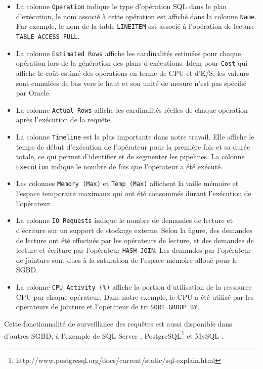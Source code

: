 \begin{itemize}
 \item La colonne \texttt{Operation} indique le type d'opération SQL dans le plan d'exécution, le nom associé à cette opération est affiché dans la colonne \texttt{Name}. Par exemple, le nom de la table \texttt{LINEITEM} est associé à l'opération de lecture \texttt{TABLE ACCESS FULL}.
 \item La colonne \texttt{Estimated Rows} affiche les cardinalités estimées pour chaque opération lors de la génération des plans d'exécutions. Idem pour \texttt{Cost} qui affiche le coût estimé des opérations en terme de CPU et d'E/S, les valeurs sont cumulées de bas vers le haut et son unité de mesure n'est pas spécifié par Oracle.
 \item La colonne \texttt{Actual Rows} affiche les cardinalités réelles de chaque opération après l'exécution de la requête.
 \item La colonne \texttt{Timeline} est la plus importante dans notre travail. Elle affiche le temps de début d'exécution de l'opérateur pour la première fois et sa durée totale, ce qui permet d'identifier et de segmenter les pipelines. La colonne \texttt{Execution} indique le nombre de fois que l'opérateur a été exécuté.
 \item Les colonnes \texttt{Memory (Max)} et \texttt{Temp (Max)} affichent la taille mémoire et l'espace temporaire maximaux qui ont été consommés durant l'exécution de l'opérateur.
 \item La colonne \texttt{IO Requests} indique le nombre de demandes de lecture et d'écriture sur un support de stockage externe. Selon la figure, des demandes de lecture ont été effectués par les opérateurs de lecture, et des demandes de lecture et écriture par l'opérateur \texttt{HASH JOIN}. Les demandes par l'opérateur de jointure sont dues à la saturation de l'espace mémoire alloué pour le SGBD.
 \item La colonne \texttt{CPU Activity (\%)} affiche la portion d'utilisation de la ressource CPU par chaque opérateur. Dans notre exemple, le CPU a été utilisé par les opérateurs de jointure et l'opérateur de tri \texttt{SORT GROUP BY}.
\end{itemize}

Cette fonctionnalité de surveillance des requêtes est aussi disponible dans d'autres SGBD, à l'exemple de SQL Server \cite{Agarwal09}, PostgreSQL\footnote{http://www.postgresql.org/docs/current/static/sql-explain.html} et MySQL \cite{MySQL10}.

